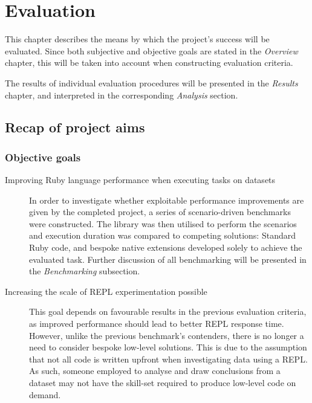 \chapter{Evaluation}
This chapter describes the means by which the project's success will be evaluated.
Since both subjective and objective goals are stated in the \emph{Overview} chapter, this will be taken into account when constructing evaluation criteria.

The results of individual evaluation procedures will be presented in the \emph{Results} chapter, and interpreted in the corresponding \emph{Analysis} section.

\section{Recap of project aims}
\subsection{Objective goals}
\begin{description}
\item[Improving Ruby language performance when executing tasks on datasets]
In order to investigate whether exploitable performance improvements are given by the completed project, a series of scenario-driven benchmarks were constructed.
The library was then utilised to perform the scenarios and execution duration was compared to competing solutions: Standard Ruby code, and bespoke native extensions developed solely to achieve the evaluated task.
Further discussion of all benchmarking will be presented in the \emph{Benchmarking} subsection.
\item[Increasing the scale of \ac{REPL} experimentation possible]
This goal depends on favourable results in the previous evaluation criteria, as improved performance should lead to better \ac{REPL} response time. However, unlike the previous benchmark's contenders, there is no longer a need to consider bespoke low-level solutions. This is due to the assumption that not all code is written upfront when investigating data using a \ac{REPL}. As such, someone employed to analyse and draw conclusions from a dataset may not have the skill-set required to produce low-level code on demand.
\end{description}

